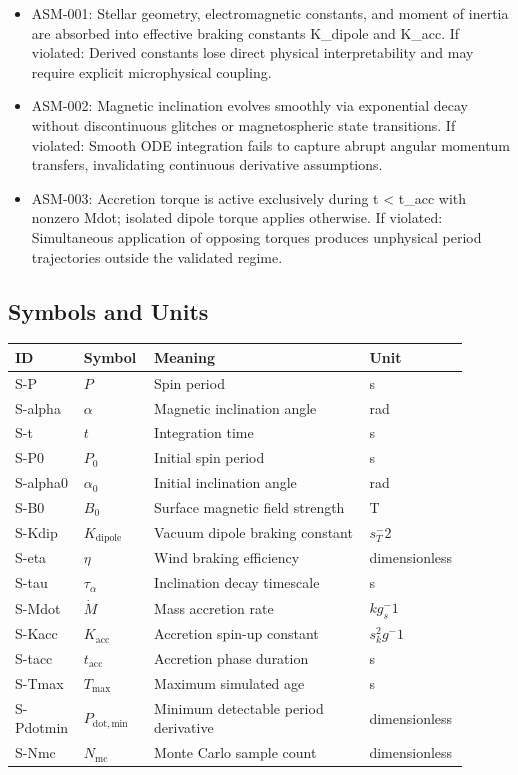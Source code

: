 \documentclass[11pt]{article}
\begin{document}
\begin{itemize}
\item ASM-001: Stellar geometry, electromagnetic constants, and moment of inertia are absorbed into effective braking constants K\_dipole and K\_acc. If violated: Derived constants lose direct physical interpretability and may require explicit microphysical coupling.
\item ASM-002: Magnetic inclination evolves smoothly via exponential decay without discontinuous glitches or magnetospheric state transitions. If violated: Smooth ODE integration fails to capture abrupt angular momentum transfers, invalidating continuous derivative assumptions.
\item ASM-003: Accretion torque is active exclusively during t < t\_acc with nonzero Mdot; isolated dipole torque applies otherwise. If violated: Simultaneous application of opposing torques produces unphysical period trajectories outside the validated regime.
\end{itemize}

\subsection{Symbols and Units}

\begin{center}
\small
\begin{tabular}{|p{0.12\linewidth}|p{0.15\linewidth}|p{0.46\linewidth}|p{0.17\linewidth}|}
\hline
ID & Symbol & Meaning & Unit \\ \hline
S-P & $P$ & Spin period & s \\ \hline
S-alpha & $\alpha$ & Magnetic inclination angle & rad \\ \hline
S-t & $t$ & Integration time & s \\ \hline
S-P0 & $P_0$ & Initial spin period & s \\ \hline
S-alpha0 & $\alpha_0$ & Initial inclination angle & rad \\ \hline
S-B0 & $B_0$ & Surface magnetic field strength & T \\ \hline
S-Kdip & $K_{\mathrm{dipole}}$ & Vacuum dipole braking constant & $s_T^-2$ \\ \hline
S-eta & $\eta$ & Wind braking efficiency & dimensionless \\ \hline
S-tau & $\tau_\alpha$ & Inclination decay timescale & s \\ \hline
S-Mdot & $\dot{M}$ & Mass accretion rate & $kg_s^-1$ \\ \hline
S-Kacc & $K_{\mathrm{acc}}$ & Accretion spin-up constant & $s^2_kg^-1$ \\ \hline
S-tacc & $t_{\mathrm{acc}}$ & Accretion phase duration & s \\ \hline
S-Tmax & $T_{\mathrm{max}}$ & Maximum simulated age & s \\ \hline
S-Pdotmin & $P_{\mathrm{dot,min}}$ & Minimum detectable period derivative & dimensionless \\ \hline
S-Nmc & $N_{\mathrm{mc}}$ & Monte Carlo sample count & dimensionless \\ \hline
\end{tabular}
\end{center}
\end{document}
